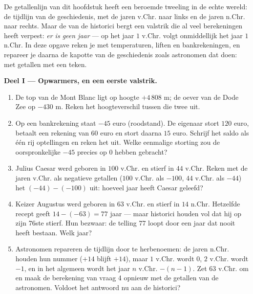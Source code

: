 \begin{problem}
\label{pb:g7:negatives:1}
De getallenlijn van dit hoofdstuk heeft een beroemde tweeling in de echte
wereld: de tijdlijn van de geschiedenis, met de jaren v.Chr. naar links en de
jaren n.Chr. naar rechts. Maar de  van de historici bergt een valstrik die al
veel berekeningen heeft verpest: \emph{er is geen jaar } --- op het jaar $1$
v.Chr. volgt onmiddellijk het jaar $1$ n.Chr. In deze opgave reken je met
temperaturen, liften en bankrekeningen, en repareer je daarna de kapotte  van
de geschiedenis zoals astronomen dat doen: met getallen met een teken.

\medskip
\noindent\textbf{Deel I --- Opwarmers, en een eerste valstrik.}
\begin{enumerate}
  \item De top van de Mont Blanc ligt op hoogte $+4\,808$ m; de oever van de Dode
        Zee op $-430$ m. Reken het hoogteverschil tussen die twee uit.
  \item Op een bankrekening staat $-45$ euro (roodstand). De eigenaar stort $120$
        euro, betaalt een rekening van $60$ euro en stort daarna $15$ euro.
        Schrijf het saldo als één rij optellingen en reken het uit. Welke
        eenmalige storting zou de oorspronkelijke $-45$ precies op $0$ hebben
        gebracht?
  \item Julius Caesar werd geboren in $100$ v.Chr. en stierf in $44$ v.Chr. Reken
        met de jaren v.Chr. als negatieve getallen ($100$ v.Chr. als $-100$, $44$
        v.Chr. als $-44$) het  $(-44) - (-100)$ uit: hoeveel jaar heeft
        Caesar geleefd?
  \item Keizer Augustus werd geboren in $63$ v.Chr. en stierf in $14$ n.Chr.
        Hetzelfde recept geeft $14 - (-63) = 77$ jaar --- maar historici houden
        vol dat hij op zijn $76$ste stierf. Hun bezwaar: de telling $77$ loopt
        door een jaar dat nooit heeft bestaan. Welk jaar?
  \item Astronomen repareren de tijdlijn door te herbenoemen: de jaren n.Chr.
        houden hun nummer ($+14$ blijft $+14$), maar $1$ v.Chr. wordt $0$, $2$
        v.Chr. wordt $-1$, en in het algemeen wordt het jaar $n$ v.Chr.
        $-(n - 1)$. Zet $63$ v.Chr. om en maak de berekening van vraag 4 opnieuw
        met de getallen van de astronomen. Voldoet het antwoord nu aan de
        historici?
\end{enumerate}


\end{problem}
